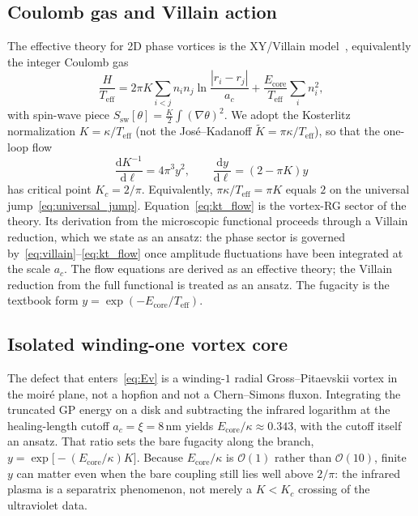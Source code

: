 \subsection{Coulomb gas and Villain action}
\label{sec:villain}

The effective theory for 2D phase vortices is the XY/Villain model~\cite{Kosterlitz1973,Villain1975,Jose1977}, equivalently the integer Coulomb gas
\begin{equation}
\frac{H}{T_{\mathrm{eff}}}
=2\pi K\sum_{i<j}n_i n_j\ln\frac{|r_i-r_j|}{a_c}
+\frac{E_{\mathrm{core}}}{T_{\mathrm{eff}}}\sum_i n_i^2,
\label{eq:villain}
\end{equation}
with spin-wave piece $S_{\mathrm{sw}}[\theta]=\frac{K}{2}\int(\nabla\theta)^2$. We adopt the Kosterlitz normalization $K=\kappa/T_{\mathrm{eff}}$ (not the Jos\'e--Kadanoff $\tilde K=\pi\kappa/T_{\mathrm{eff}}$), so that the one-loop flow
\begin{equation}
\frac{\mathrm{d}K^{-1}}{\mathrm{d}\ell}=4\pi^3 y^2,\qquad
\frac{\mathrm{d}y}{\mathrm{d}\ell}=(2-\pi K)y
\label{eq:kt_flow}
\end{equation}
has critical point $K_c=2/\pi$. Equivalently, $\pi\kappa/T_{\mathrm{eff}}=\pi K$ equals $2$ on the universal jump~\eqref{eq:universal_jump}. Equation~\eqref{eq:kt_flow} is the vortex-RG sector of the theory. Its derivation from the microscopic \TQGL{} functional proceeds through a Villain reduction, which we state as an ansatz: the phase sector is governed by~\eqref{eq:villain}--\eqref{eq:kt_flow} once amplitude fluctuations have been integrated at the scale $a_c$. The flow equations are derived as an effective theory; the Villain reduction from the full \TQGL{} functional is treated as an ansatz. The fugacity is the textbook form $y=\exp(-E_{\mathrm{core}}/T_{\mathrm{eff}})$.

\subsection{Isolated winding-one vortex core}
\label{sec:c2_core}

The defect that enters~\eqref{eq:Ev} is a winding-$1$ radial Gross--Pitaevskii vortex in the moir\'e plane, not a hopfion and not a Chern--Simons fluxon. Integrating the truncated GP energy on a disk and subtracting the infrared logarithm at the healing-length cutoff $a_c=\xi=8$\,nm yields $E_{\mathrm{core}}/\kappa\approx 0.343$, with the cutoff itself an ansatz. That ratio sets the bare fugacity along the branch, $y=\exp\bigl[-(E_{\mathrm{core}}/\kappa)K\bigr]$. Because $E_{\mathrm{core}}/\kappa$ is $\mathcal{O}(1)$ rather than $\mathcal{O}(10)$, finite $y$ can matter even when the bare coupling still lies well above $2/\pi$: the infrared plasma is a separatrix phenomenon, not merely a $K<K_c$ crossing of the ultraviolet data.

